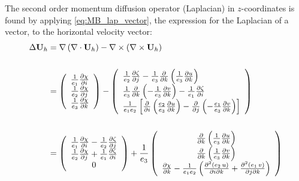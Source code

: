 \documentclass[../main/NEMO_manual]{subfiles}
\begin{document}
The second order momentum diffusion operator (Laplacian) in $z$-coordinates is found by
applying \autoref{eq:MB_lap_vector}, the expression for the Laplacian of a vector,
to the horizontal velocity vector:
\begin{align*}
  \Delta {\textbf{U}}_h
  &=\nabla \left( {\nabla \cdot {\textbf{U}}_h } \right)-
    \nabla \times \left( {\nabla \times {\textbf{U}}_h } \right) \\ \\
  &=\left( {{
    \begin{array}{*{20}c}
      {\frac{1}{e_1 }\frac{\partial \chi }{\partial i}} \hfill \\
      {\frac{1}{e_2 }\frac{\partial \chi }{\partial j}} \hfill \\
      {\frac{1}{e_3 }\frac{\partial \chi }{\partial k}} \hfill \\
    \end{array}
  }} \right)
  -\left( {{
  \begin{array}{*{20}c}
    {\frac{1}{e_2 }\frac{\partial \zeta }{\partial j}-\frac{1}{e_3
    }\frac{\partial }{\partial k}\left( {\frac{1}{e_3 }\frac{\partial
    u}{\partial k}} \right)} \hfill \\
    {\frac{1}{e_3 }\frac{\partial }{\partial k}\left( {-\frac{1}{e_3
    }\frac{\partial v}{\partial k}} \right)-\frac{1}{e_1 }\frac{\partial \zeta
    }{\partial i}} \hfill \\
    {\frac{1}{e_1 e_2 }\left[ {\frac{\partial }{\partial i}\left( {\frac{e_2
    }{e_3 }\frac{\partial u}{\partial k}} \right)-\frac{\partial }{\partial
    j}\left( {-\frac{e_1 }{e_3 }\frac{\partial v}{\partial k}} \right)} \right]}
    \hfill \\
  \end{array}
  }} \right) \\ \\
  &=\left( {{
    \begin{array}{*{20}c}
      {\frac{1}{e_1 }\frac{\partial \chi }{\partial i}-\frac{1}{e_2 }\frac{\partial \zeta }{\partial j}} \\
      {\frac{1}{e_2 }\frac{\partial \chi }{\partial j}+\frac{1}{e_1 }\frac{\partial \zeta }{\partial i}} \\
      0 \\
    \end{array}
  }} \right)
  +\frac{1}{e_3 }
  \left( {{
  \begin{array}{*{20}c}
    {\frac{\partial }{\partial k}\left( {\frac{1}{e_3 }\frac{\partial u}{\partial k}} \right)} \\
    {\frac{\partial }{\partial k}\left( {\frac{1}{e_3 }\frac{\partial v}{\partial k}} \right)} \\
    {\frac{\partial \chi }{\partial k}-\frac{1}{e_1 e_2 }\left( {\frac{\partial ^2\left( {e_2 \,u} \right)}{\partial i\partial k}+\frac{\partial ^2\left( {e_1 \,v} \right)}{\partial j\partial k}} \right)} \\
  \end{array}
  }} \right)
\end{align*}
\end{document}

